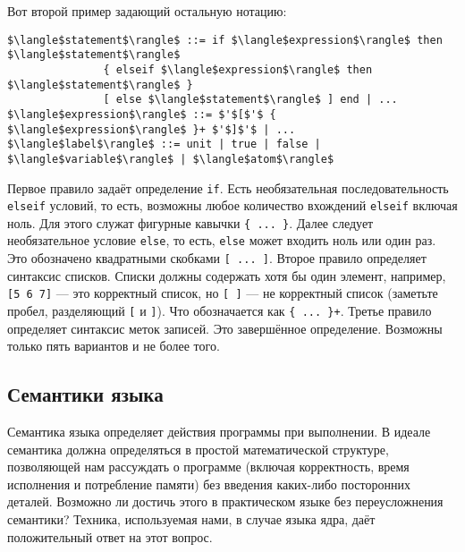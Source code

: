Вот второй пример задающий остальную нотацию:

\begin{lstlisting}
$\langle$statement$\rangle$ ::= if $\langle$expression$\rangle$ then $\langle$statement$\rangle$
               { elseif $\langle$expression$\rangle$ then $\langle$statement$\rangle$ }
               [ else $\langle$statement$\rangle$ ] end | ...
$\langle$expression$\rangle$ ::= $'$[$'$ { $\langle$expression$\rangle$ }+ $'$]$'$ | ...
$\langle$label$\rangle$ ::= unit | true | false | $\langle$variable$\rangle$ | $\langle$atom$\rangle$
\end{lstlisting}

Первое правило задаёт определение \lstinline|if|. Есть необязательная последовательность \lstinline|elseif| условий, то есть, возможны любое количество вхождений \lstinline|elseif| включая ноль. Для этого служат фигурные кавычки \lstinline|{ ... }|. Далее следует необязательное условие \lstinline|else|, то есть, \lstinline|else| может входить ноль или один раз. Это обозначено квадратными скобками \lstinline|[ ... ]|. Второе правило определяет синтаксис списков. Списки должны содержать хотя бы один элемент, например, \lstinline|[5 6 7]| --- это корректный список, но \lstinline|[ ]| --- не корректный список (заметьте пробел, разделяющий \lstinline|[| и \lstinline|]|). Что обозначается как \lstinline|{ ... }+|. Третье правило определяет синтаксис меток записей. Это завершённое определение. Возможны только пять вариантов и не более того.

\subsection{Семантики языка}

Семантика языка определяет действия программы при выполнении. В идеале семантика должна определяться в простой математической структуре, позволяющей нам рассуждать о программе (включая корректность, время исполнения и потребление памяти) без введения каких-либо посторонних деталей. Возможно ли достичь этого в практическом языке без переусложнения семантики? Техника, используемая нами, в случае языка ядра, даёт положительный ответ на этот вопрос.

